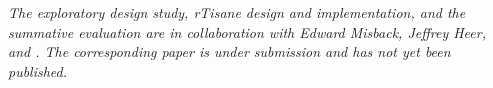 




\textit{The exploratory design study, rTisane design and implementation, and the
summative evaluation are in collaboration with Edward Misback, Jeffrey Heer, and
\reneJust. The corresponding paper is under submission and has not yet been
published.}
